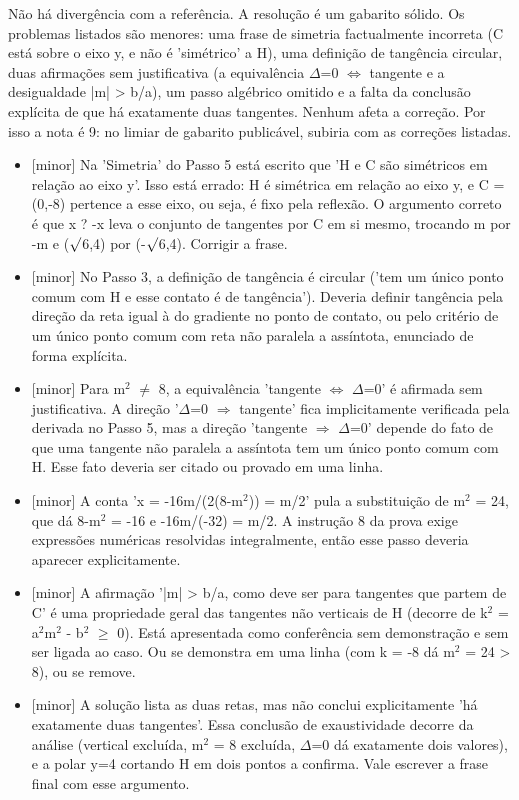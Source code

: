 \documentclass{article}%
\begin{document}
\newline%
Não há divergência com a referência. A resolução é um gabarito sólido. Os problemas listados são menores: uma frase de simetria factualmente incorreta (C está sobre o eixo y, e não é 'simétrico' a H), uma definição de tangência circular, duas afirmações sem justificativa (a equivalência $\Delta$=0 $\Leftrightarrow$ tangente e a desigualdade |m| > b/a), um passo algébrico omitido e a falta da conclusão explícita de que há exatamente duas tangentes. Nenhum afeta a correção. Por isso a nota é 9: no limiar de gabarito publicável, subiria com as correções listadas.%
\begin{itemize}%
\item%
{[}minor{]} Na 'Simetria' do Passo 5 está escrito que 'H e C são simétricos em relação ao eixo y'. Isso está errado: H é simétrica em relação ao eixo y, e C = (0,{-}8) pertence a esse eixo, ou seja, é fixo pela reflexão. O argumento correto é que x ? {-}x leva o conjunto de tangentes por C em si mesmo, trocando m por {-}m e ($\surd$6,4) por ({-}$\surd$6,4). Corrigir a frase.%
\item%
{[}minor{]} No Passo 3, a definição de tangência é circular ('tem um único ponto comum com H e esse contato é de tangência'). Deveria definir tangência pela direção da reta igual à do gradiente no ponto de contato, ou pelo critério de um único ponto comum com reta não paralela a assíntota, enunciado de forma explícita.%
\item%
{[}minor{]} Para m$^2$ $\neq$ 8, a equivalência 'tangente $\Leftrightarrow$ $\Delta$=0' é afirmada sem justificativa. A direção '$\Delta$=0 $\Rightarrow$ tangente' fica implicitamente verificada pela derivada no Passo 5, mas a direção 'tangente $\Rightarrow$ $\Delta$=0' depende do fato de que uma tangente não paralela a assíntota tem um único ponto comum com H. Esse fato deveria ser citado ou provado em uma linha.%
\item%
{[}minor{]} A conta 'x = -16m/(2(8-m$^2$)) = m/2' pula a substituição de m$^2$ = 24, que dá 8-m$^2$ = -16 e -16m/(-32) = m/2. A instrução 8 da prova exige expressões numéricas resolvidas integralmente, então esse passo deveria aparecer explicitamente.%
\item%
{[}minor{]} A afirmação '|m| > b/a, como deve ser para tangentes que partem de C' é uma propriedade geral das tangentes não verticais de H (decorre de k$^2$ = a$^2$m$^2$ - b$^2$ $\geq$ 0). Está apresentada como conferência sem demonstração e sem ser ligada ao caso. Ou se demonstra em uma linha (com k = -8 dá m$^2$ = 24 > 8), ou se remove.%
\item%
{[}minor{]} A solução lista as duas retas, mas não conclui explicitamente 'há exatamente duas tangentes'. Essa conclusão de exaustividade decorre da análise (vertical excluída, m$^2$ = 8 excluída, $\Delta$=0 dá exatamente dois valores), e a polar y=4 cortando H em dois pontos a confirma. Vale escrever a frase final com esse argumento.%
\end{itemize}%
\end{document}
